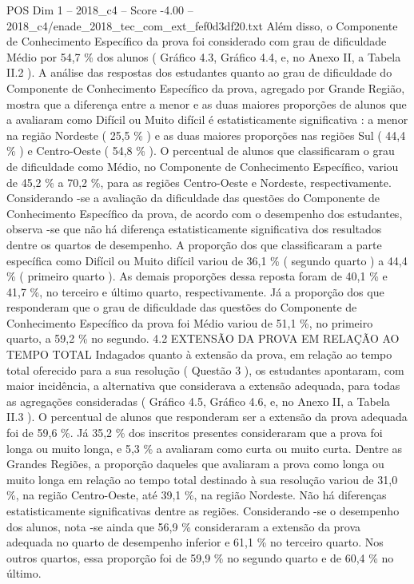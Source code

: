 \begin{textsample}{POS Dim 1 – 2018\_c4 – Score -4.00 – 2018\_c4/enade\_2018\_tec\_com\_ext\_fef0d3df20.txt}
Além disso, o Componente de Conhecimento Específico da prova foi considerado com grau de dificuldade Médio por 54,7 \% dos alunos ( Gráfico 4.3, Gráfico 4.4, e, no Anexo II, a Tabela II.2 ).
A análise das respostas dos estudantes quanto ao grau de dificuldade do Componente de Conhecimento Específico da prova, agregado por Grande Região, mostra que a diferença entre a menor e as duas maiores proporções de alunos que a avaliaram como Difícil ou Muito difícil é estatisticamente significativa : a menor na região Nordeste ( 25,5 \% ) e as duas maiores proporções nas regiões Sul ( 44,4 \% ) e Centro-Oeste ( 54,8 \% ).
O percentual de alunos que classificaram o grau de dificuldade como Médio, no Componente de Conhecimento Específico, variou de 45,2 \% a 70,2 \%, para as regiões Centro-Oeste e Nordeste, respectivamente.
Considerando -se a avaliação da dificuldade das questões do Componente de Conhecimento Específico da prova, de acordo com o desempenho dos estudantes, observa -se que não há diferença estatisticamente significativa dos resultados dentre os quartos de desempenho.
A proporção dos que classificaram a parte específica como Difícil ou Muito difícil variou de 36,1 \% ( segundo quarto ) a 44,4 \% ( primeiro quarto ).
As demais proporções dessa reposta foram de 40,1 \% e 41,7 \%, no terceiro e último quarto, respectivamente.
Já a proporção dos que responderam que o grau de dificuldade das questões do Componente de Conhecimento Específico da prova foi Médio variou de 51,1 \%, no primeiro quarto, a 59,2 \% no segundo. 4.2 EXTENSÃO DA PROVA EM RELAÇÃO AO TEMPO TOTAL Indagados quanto à extensão da prova, em relação ao tempo total oferecido para a sua resolução ( Questão 3 ), os estudantes apontaram, com maior incidência, a alternativa que considerava a extensão adequada, para todas as agregações consideradas ( Gráfico 4.5, Gráfico 4.6, e, no Anexo II, a Tabela II.3 ).
O percentual de alunos que responderam ser a extensão da prova adequada foi de 59,6 \%.
Já 35,2 \% dos inscritos presentes consideraram que a prova foi longa ou muito longa, e 5,3 \% a avaliaram como curta ou muito curta.
Dentre as Grandes Regiões, a proporção daqueles que avaliaram a prova como longa ou muito longa em relação ao tempo total destinado à sua resolução variou de 31,0 \%, na região Centro-Oeste, até 39,1 \%, na região Nordeste.
Não há diferenças estatisticamente significativas dentre as regiões.
Considerando -se o desempenho dos alunos, nota -se ainda que 56,9 \% consideraram a extensão da prova adequada no quarto de desempenho inferior e 61,1 \% no terceiro quarto.
Nos outros quartos, essa proporção foi de 59,9 \% no segundo quarto e de 60,4 \% no último.

\end{textsample}
